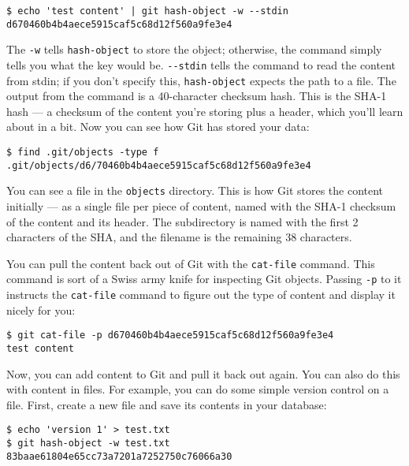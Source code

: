 \documentclass[a4paper]{book}
\newcounter{tab}[chapter]
\begin{document}
\begin{shaded}\begin{verbatim}
$ echo 'test content' | git hash-object -w --stdin
d670460b4b4aece5915caf5c68d12f560a9fe3e4
\end{verbatim}\end{shaded}

The \texttt{-w} tells \texttt{hash-object} to store the object; otherwise, the command simply tells you what the key would be. \texttt{-{}-stdin} tells the command to read the content from stdin; if you don't specify this, \texttt{hash-object} expects the path to a file. The output from the command is a 40-character checksum hash. This is the SHA-1 hash --- a checksum of the content you're storing plus a header, which you'll learn about in a bit. Now you can see how Git has stored your data:

\begin{shaded}\begin{verbatim}
$ find .git/objects -type f
.git/objects/d6/70460b4b4aece5915caf5c68d12f560a9fe3e4
\end{verbatim}\end{shaded}

You can see a file in the \texttt{objects} directory. This is how Git stores the content initially --- as a single file per piece of content, named with the SHA-1 checksum of the content and its header. The subdirectory is named with the first 2 characters of the SHA, and the filename is the remaining 38 characters.

You can pull the content back out of Git with the \texttt{cat-file} command. This command is sort of a Swiss army knife for inspecting Git objects. Passing \texttt{-p} to it instructs the \texttt{cat-file} command to figure out the type of content and display it nicely for you:

\begin{shaded}\begin{verbatim}
$ git cat-file -p d670460b4b4aece5915caf5c68d12f560a9fe3e4
test content
\end{verbatim}\end{shaded}

Now, you can add content to Git and pull it back out again. You can also do this with content in files. For example, you can do some simple version control on a file. First, create a new file and save its contents in your database:

\begin{shaded}\begin{verbatim}
$ echo 'version 1' > test.txt
$ git hash-object -w test.txt
83baae61804e65cc73a7201a7252750c76066a30
\end{verbatim}\end{shaded}
\end{document}
